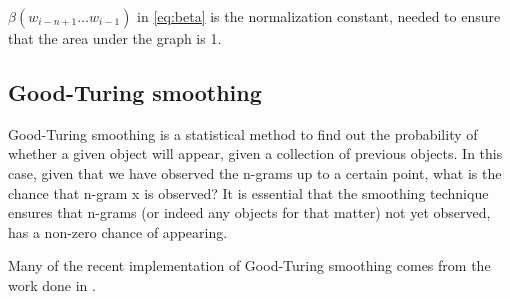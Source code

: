 $\beta (w_{i - n + 1}\ldots w_{i -1})$ in \ref{eq:beta} is the normalization constant, needed to ensure that the area under the graph is 1.  


\subsection{Good-Turing smoothing}
\label{Good-Turing}
Good-Turing smoothing is a statistical method to find out the probability of whether a given object will appear, given a collection of previous objects. In this case, given that we have observed the n-grams up to a certain point, what is the chance that n-gram x is observed? It is essential that the smoothing technique ensures that n-grams (or indeed any objects for that matter) not yet observed, has a non-zero chance of appearing.

Many of the recent implementation of Good-Turing smoothing comes from the work done in \cite{Gale94good-turingsmoothing}.
